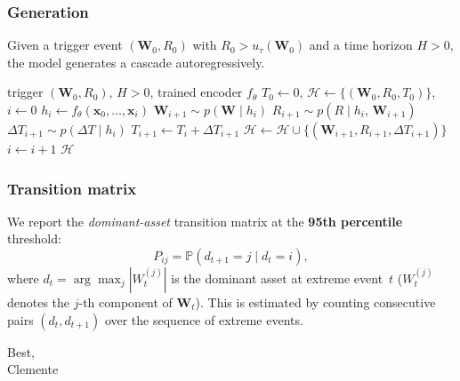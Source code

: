 \documentclass[11pt,a4paper]{article}
\begin{document}
\subsubsection*{Generation}

Given a trigger event $(\boldsymbol{W}_0, R_0)$ with
$R_0 > u_\tau(\boldsymbol{W}_0)$ and a time horizon $H > 0$,
the model generates a cascade autoregressively.

\begin{algorithm}[H]
\caption{-}
\begin{algorithmic}[1]
\Require trigger $(\boldsymbol{W}_0, R_0)$,\; $H > 0$,\; trained encoder $f_\theta$
\State $T_0 \gets 0$,\; $\mathcal{H} \gets \{(\boldsymbol{W}_0, R_0, T_0)\}$,\; $i \gets 0$
  \State $h_i \gets f_\theta(\boldsymbol{x}_0, \ldots, \boldsymbol{x}_i)$
  \State $\boldsymbol{W}_{i+1} \sim p(\boldsymbol{W} \mid h_i)$
  \State $R_{i+1} \sim p(R \mid h_i,\, \boldsymbol{W}_{i+1})$
  \State $\Delta T_{i+1} \sim p(\Delta T \mid h_i)$
  \State $T_{i+1} \gets T_i + \Delta T_{i+1}$
  \State $\mathcal{H} \gets \mathcal{H} \cup
         \{(\boldsymbol{W}_{i+1}, R_{i+1}, \Delta T_{i+1})\}$
  \State $i \gets i + 1$
\EndWhile
\State \Return $\mathcal{H}$
\end{algorithmic}
\end{algorithm}

\subsubsection*{Transition matrix}

We report the \emph{dominant-asset} transition matrix at the
\textbf{95th percentile} threshold:
%
\[
  P_{ij} = \mathbb{P}(d_{t+1} = j \mid d_t = i),
\]
%
where $d_t = \arg\max_j |W_t^{(j)}|$ is the dominant asset at extreme
event~$t$ ($W_t^{(j)}$ denotes the $j$-th component of $\boldsymbol{W}_t$).
This is estimated by counting consecutive pairs $(d_t, d_{t+1})$ over the
sequence of extreme events.

\bigskip

Best,\\
Clemente
\end{document}
